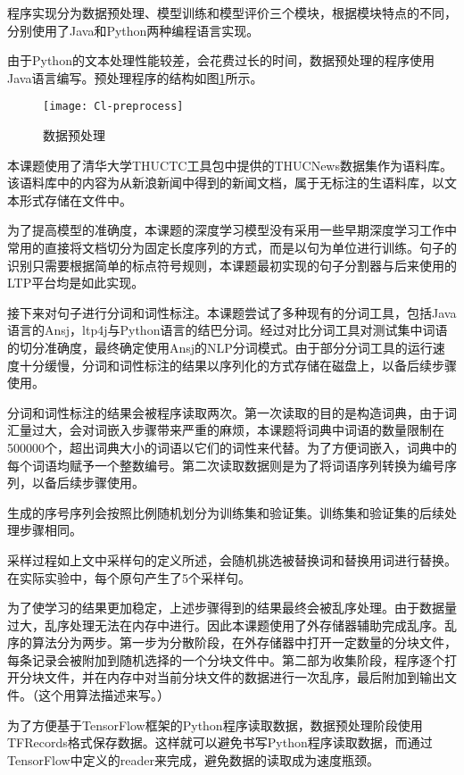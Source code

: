 程序实现分为数据预处理、模型训练和模型评价三个模块，根据模块特点的不同，分别使用了Java和Python两种编程语言实现。

由于Python的文本处理性能较差，会花费过长的时间，数据预处理的程序使用Java语言编写。预处理程序的结构如图\ref{f:classfier preprocess}所示。

\begin{figure}[htbp]
	\centering
	\texttt{[image: Cl-preprocess]}
	\caption{数据预处理}
	\label{f:classfier preprocess}
	\vspace{-1em}
\end{figure}

本课题使用了清华大学THUCTC工具包中提供的THUCNews数据集作为语料库。该语料库中的内容为从新浪新闻中得到的新闻文档，属于无标注的生语料库，以文本形式存储在文件中。

为了提高模型的准确度，本课题的深度学习模型没有采用一些早期深度学习工作中常用的直接将文档切分为固定长度序列的方式，而是以句为单位进行训练。句子的识别只需要根据简单的标点符号规则，本课题最初实现的句子分割器与后来使用的LTP平台均是如此实现。

接下来对句子进行分词和词性标注。本课题尝试了多种现有的分词工具，包括Java语言的Ansj，ltp4j与Python语言的结巴分词。经过对比分词工具对测试集中词语的切分准确度，最终确定使用Ansj的NLP分词模式。由于部分分词工具的运行速度十分缓慢，分词和词性标注的结果以序列化的方式存储在磁盘上，以备后续步骤使用。

分词和词性标注的结果会被程序读取两次。第一次读取的目的是构造词典，由于词汇量过大，会对词嵌入步骤带来严重的麻烦，本课题将词典中词语的数量限制在500000个，超出词典大小的词语以它们的词性来代替。为了方便词嵌入，词典中的每个词语均赋予一个整数编号。第二次读取数据则是为了将词语序列转换为编号序列，以备后续步骤使用。

生成的序号序列会按照比例随机划分为训练集和验证集。训练集和验证集的后续处理步骤相同。

采样过程如上文中采样句的定义所述，会随机挑选被替换词和替换用词进行替换。在实际实验中，每个原句产生了5个采样句。

为了使学习的结果更加稳定，上述步骤得到的结果最终会被乱序处理。由于数据量过大，乱序处理无法在内存中进行。因此本课题使用了外存储器辅助完成乱序。乱序的算法分为两步。第一步为分散阶段，在外存储器中打开一定数量的分块文件，每条记录会被附加到随机选择的一个分块文件中。第二部为收集阶段，程序逐个打开分块文件，并在内存中对当前分块文件的数据进行一次乱序，最后附加到输出文件。（这个用算法描述来写。）

为了方便基于TensorFlow框架的Python程序读取数据，数据预处理阶段使用TFRecords格式保存数据。这样就可以避免书写Python程序读取数据，而通过TensorFlow中定义的reader来完成，避免数据的读取成为速度瓶颈。

